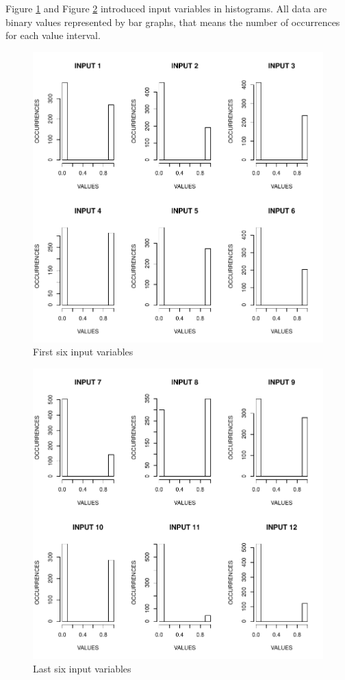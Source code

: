 \documentclass[a4paper,twoside]{article}
\begin{document}
Figure \ref{fig:input16} and Figure \ref{fig:input712} introduced input variables in histograms. All data are binary values represented by bar graphs, that means the number of occurrences for each value interval. 

\begin{figure}[!h]
  \vspace{-0.2cm}
  \centering
  \includegraphics[width=\columnwidth]{images/input1_6.pdf}
  \caption{First six input variables}
  \label{fig:input16}
\end{figure}

\begin{figure}[!h]
  \vspace{-0.2cm}
  \centering
  \includegraphics[width=\columnwidth]{images/input7_12.pdf}
  \caption{Last six input variables}
  \label{fig:input712}
\end{figure}
\end{document}
